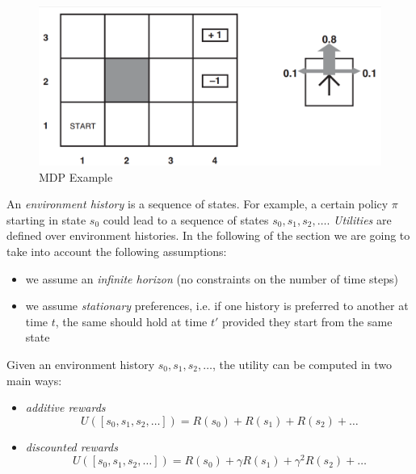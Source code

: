 \begin{figure}[H]
	\centering
	\includegraphics[width=\textwidth]{
		images/19_ReinforcementLearning_markovDecisionProcess.png
	}
	\caption{MDP Example}
	\label{fig:mdpExample}
\end{figure}

An \textit{environment history} is a sequence of states. For example, a certain
policy $\pi$ starting in state $s_{0}$ could lead to a sequence of states
$s_{0}, s_{1}, s_{2}, \hdots$. \textit{Utilities} are defined over environment
histories. In the following of the section we are going to take into account the
following assumptions:
\begin{itemize}
	\item we assume an \textit{infinite horizon} (no constraints on the number of time
		steps)

	\item we assume \textit{stationary} preferences, i.e. if one history is
		preferred to another at time $t$, the same should hold at time $t'$ provided
		they start from the same state
\end{itemize}

Given an environment history $s_{0}, s_{1}, s_{2}, \hdots$, the utility can be
computed in two main ways:
\begin{itemize}
	\item \textit{additive rewards}
		\begin{equation}
			U([s_{0}, s_{1}, s_{2}, \hdots]) = R(s_{0}) + R(s_{1}) + R(s_{2}) + \hdots
		\end{equation}

	\item \textit{discounted rewards}
		\begin{equation}
			U([s_{0}, s_{1}, s_{2}, \hdots]) = R(s_{0}) + \gamma R(s_{1}) + \gamma^{2}
			R(s_{2}) + \hdots
		\end{equation}
\end{itemize}

